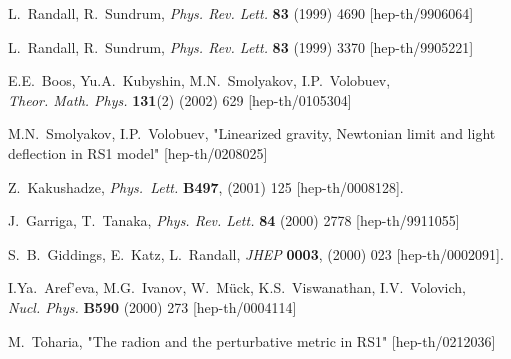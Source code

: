 \documentclass[a4paper,12pt]{article}
\begin{document}
\begin{thebibliography}{99}
L.~Randall, R.~Sundrum, {\em Phys. Rev. Lett.} {\bf 83} (1999)
4690 [hep-th/9906064]

L.~Randall, R.~Sundrum, {\em Phys. Rev. Lett.} {\bf 83} (1999)
3370 [hep-th/9905221]

E.E.~Boos, Yu.A.~Kubyshin, M.N.~Smolyakov, I.P.~Volobuev,\\ {\em
Theor. Math. Phys.} {\bf 131}(2) (2002) 629 [hep-th/0105304]

M.N.~Smolyakov, I.P.~Volobuev, "Linearized gravity, Newtonian
limit and light deflection in RS1 model" [hep-th/0208025]

Z.~Kakushadze,
{\em Phys.\ Lett.} {\bf B497}, (2001) 125 [hep-th/0008128].

J.~Garriga, T.~Tanaka, {\em Phys. Rev. Lett.} {\bf 84} (2000) 2778
[hep-th/9911055]

S.~B.~Giddings, E.~Katz, L.~Randall,
{\em JHEP} {\bf 0003}, (2000) 023 [hep-th/0002091].

I.Ya.~Aref'eva, M.G.~Ivanov, W.~M\"uck,
K.S.~Viswanathan, I.V.~Volovich,\\ {\em Nucl. Phys.} {\bf B590}
(2000) 273 [hep-th/0004114]

M.~Toharia, "The radion and the perturbative metric in RS1"
[hep-th/0212036]

\end{thebibliography}
\end{document}
